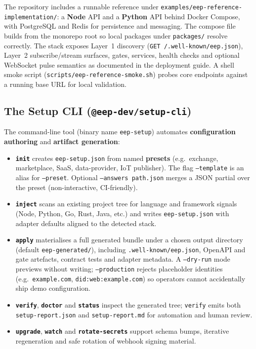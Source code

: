 \documentclass[12pt,a4paper]{article}
\begin{document}
The repository includes a runnable reference under \texttt{examples/eep-reference-implementation/}: a \textbf{Node} API and a \textbf{Python} API behind Docker Compose, with PostgreSQL and Redis for persistence and messaging. The compose file builds from the monorepo root so local packages under \texttt{packages/} resolve correctly. The stack exposes Layer~1 discovery (\texttt{GET /.well-known/eep.json}), Layer~2 subscribe/stream surfaces, gates, services, health checks and optional WebSocket pulse semantics as documented in the deployment guide. A shell smoke script (\texttt{scripts/eep-reference-smoke.sh}) probes core endpoints against a running base URL for local validation.

\subsection{The Setup CLI (\texttt{@eep-dev/setup-cli})}

The command-line tool (binary name \texttt{eep-setup}) automates \textbf{configuration authoring} and \textbf{artifact generation}:

\begin{itemize}
    \item \textbf{\texttt{init}} creates \texttt{eep-setup.json} from named \textbf{presets} (e.g.\ exchange, marketplace, SaaS, data-provider, IoT publisher). The flag \texttt{--template} is an alias for \texttt{--preset}. Optional \texttt{--answers path.json} merges a JSON partial over the preset (non-interactive, CI-friendly).
    \item \textbf{\texttt{inject}} scans an existing project tree for language and framework signals (Node, Python, Go, Rust, Java, etc.) and writes \texttt{eep-setup.json} with adapter defaults aligned to the detected stack.
    \item \textbf{\texttt{apply}} materialises a full generated bundle under a chosen output directory (default \texttt{eep-generated/}), including \texttt{.well-known/eep.json}, OpenAPI and gate artefacts, contract tests and adapter metadata. A \texttt{--dry-run} mode previews without writing; \texttt{--production} rejects placeholder identities (e.g.\ \texttt{example.com}, \texttt{did:web:example.com}) so operators cannot accidentally ship demo configuration.
    \item \textbf{\texttt{verify}}, \textbf{\texttt{doctor}} and \textbf{\texttt{status}} inspect the generated tree; \texttt{verify} emits both \texttt{setup-report.json} and \texttt{setup-report.md} for automation and human review.
    \item \textbf{\texttt{upgrade}}, \textbf{\texttt{watch}} and \textbf{\texttt{rotate-secrets}} support schema bumps, iterative regeneration and safe rotation of webhook signing material.
\end{itemize}
\end{document}
